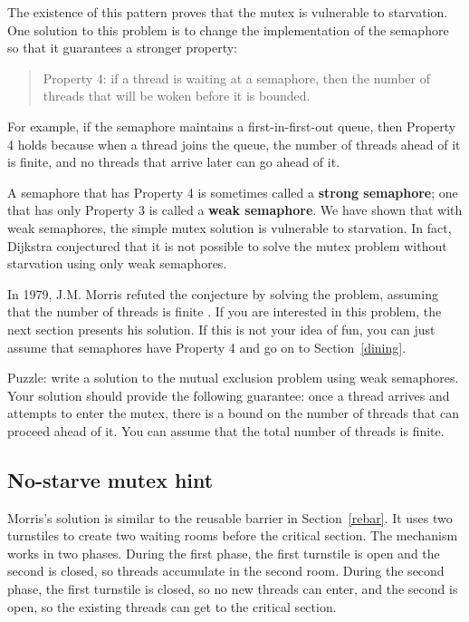 \documentclass{book}
\newcommand{\clearemptydoublepage}{\newpage\cleardoublepage}
\begin{document}
The existence of this pattern proves that the mutex is
vulnerable to starvation.  One solution to this problem is
to change the implementation of the semaphore so that it
guarantees a stronger property:

\begin{quote}
Property 4: if a thread is waiting at a semaphore, then the
number of threads that will be woken before it is bounded.
\end{quote}

For example, if the semaphore maintains a first-in-first-out
queue, then Property 4 holds because when a thread joins the
queue, the number of threads ahead of it is finite, and
no threads that arrive later can go ahead of it.

A semaphore that has Property 4 is sometimes called a {\bf strong
semaphore}; one that has only Property 3 is called a {\bf weak
semaphore}.  We have shown that with weak semaphores, the simple mutex
solution is vulnerable to starvation.  In fact, Dijkstra conjectured
that it is not possible to solve the mutex problem without starvation
using only weak semaphores.

In 1979, J.M. Morris refuted the conjecture by solving the problem,
assuming that the number of threads is finite \cite{morris}.  If you
are interested in this problem, the next section presents his
solution.  If this is not your idea of fun, you can just assume that
semaphores have Property 4 and go on to Section~\ref{dining}.

Puzzle: write a solution to the mutual exclusion problem using weak
semaphores.  Your solution should provide the following guarantee:
once a thread arrives and attempts to enter the mutex, there is a
bound on the number of threads that can proceed ahead of it.  You can
assume that the total number of threads is finite.


\clearemptydoublepage
\subsection{No-starve mutex hint}
\label{morris}

Morris's solution is similar to the reusable barrier in
Section~\ref{rebar}.  It uses two turnstiles to create two waiting
rooms before the critical section.  The mechanism works in two phases.
During the first phase, the first turnstile is open and the second is
closed, so threads accumulate in the second room.  During the second
phase, the first turnstile is closed, so no new threads can enter, and
the second is open, so the existing threads can get to the critical
section.
\end{document}
